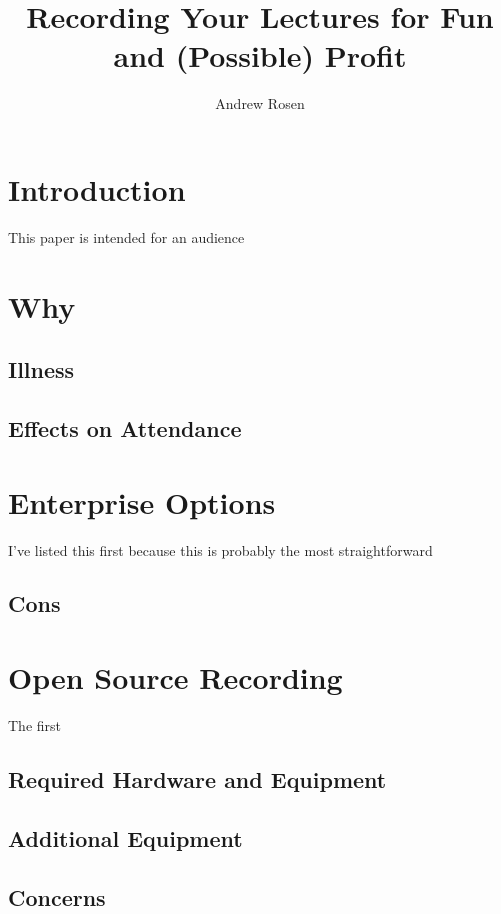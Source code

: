 \documentclass[sigconf]{acmart}
\title{Recording Your Lectures for Fun and (Possible) Profit}
\author{Andrew Rosen}
\affiliation{\institution{Temple University}}
\begin{document}
\maketitle



\section{Introduction}

This paper is intended for an audience 
\section{Why}

\subsection{Illness}

\subsection{Effects on Attendance}


\section{Enterprise Options}
I've listed this first because this is probably the most straightforward 


\subsection{Cons}


\section{Open Source Recording}
The first 




\subsection{Required Hardware and Equipment}


\subsection{Additional Equipment}



\subsection{Concerns}
\end{document}
